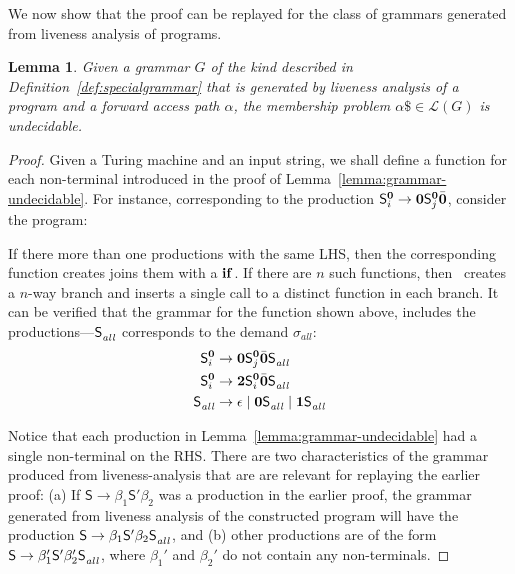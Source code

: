 \documentclass[preprint, 9pt]{sigplanconf}
\newtheorem{lemma}[theorem]{Lemma}
\begin{document}
We now show that the proof can be replayed for the class of grammars
generated from liveness analysis of programs. 

\begin{lemma}\label{lemma:grammar-from-analysis-undecidable}
Given   a    grammar    $G$    of   the    kind    described    in
Definition~\ref{def:specialgrammar}  that  is  generated  by  liveness
analysis  of a  program  and  a forward  access  path $\alpha$,    the
membership problem $\alpha\$ \in \mathscr{L}(G)$ is undecidable.
\end{lemma} 

\begin{proof}
Given a Turing machine and an input string, we shall define a function
for   each  non-terminal   introduced  in   the  proof   of
Lemma~\ref{lemma:grammar-undecidable}.
For instance, corresponding to the production $\mathsf{S}_{i}^{\mathbf{0}} \rightarrow
\mathbf{0} \mathsf{S}_{j}^{\mathbf{0}}\bar{\mathbf{0}}$,  consider
the program:
 


If there more than one productions with the same LHS, then the
corresponding function creates joins them with a $\mbox{$\mathbf{ if}$}$.   If there
are $n$ such functions,  then \mainpgm\  creates  a $n$-way
branch  and inserts  a  single call  to a  distinct  function in  each
branch. It can  be verified that the grammar for the function shown
above, includes the productions---$\mathsf{S}_{\mathit{all}}^{}$
corresponds to the demand $\sigma_{\mathit{all}}$:
\begin{align*}
\mathsf{S}_{i}^{\mathbf{0}} &\rightarrow \mathbf{0}\mathsf{S}_{j}^{\mathbf{0}}\bar{\mathbf{0}}\mathsf{S}_{\mathit{all}}^{} \\
\mathsf{S}_{i}^{\mathbf{0}} &\rightarrow {\mathbf{2}}\mathsf{S}_{i}^{\mathbf{0}}\bar{\mathbf{0}}\mathsf{S}_{\mathit{all}}^{} \\
\mathsf{S}_{\mathit{all}}^{} &\rightarrow \epsilon \mid \mathbf{0}\mathsf{S}_{\mathit{all}}^{} \mid
\mathbf{1}\mathsf{S}_{\mathit{all}}^{}
\end{align*}



Notice that  each production  in Lemma~\ref{lemma:grammar-undecidable}
had a single non-terminal on the RHS. There are two characteristics of
the grammar produced from liveness-analysis  that are are relevant for
replaying the  earlier proof:  (a) If $\mathsf{S}  \rightarrow \beta_1
\mathsf{S'}  \beta_2$  was a  production  in  the earlier  proof,  the
grammar  generated from  liveness  analysis of the constructed program
will  have the  production
$\mathsf{S}      \rightarrow      \beta_1     \mathsf{S'}      \beta_2
\mathsf{S}_{\mathit{\mathit{all}}}^{}$,  and (b)  other  productions are  of the  form
$\mathsf{S}       \rightarrow       \beta_1'\mathsf{S'}       \beta_2'
\mathsf{S}_{\mathit{all}}^{}$, where $\beta_1'$ and $\beta_2'$ do not contain
any non-terminals.


\end{proof}
\end{document}
